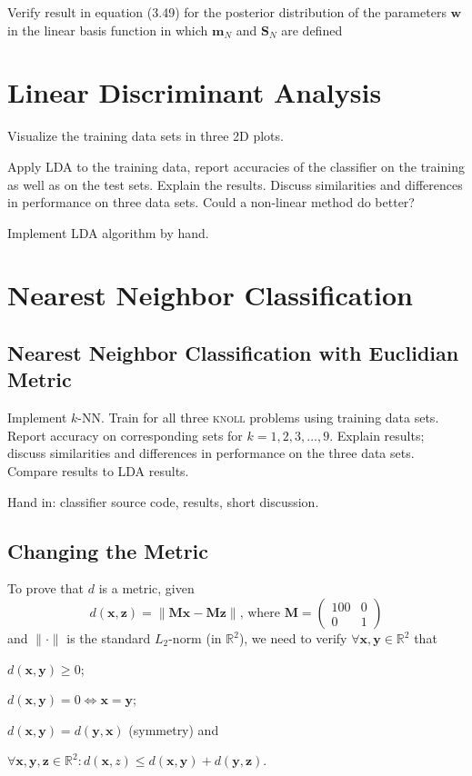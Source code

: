 \documentclass{article}
\newcommand{\vect}[1]{\ensuremath{\boldsymbol{\mathbf{#1}}}\xspace}
\begin{document}
Verify result in equation (3.49) for the posterior distribution of the
parameters \vect{w} in the linear basis function in which $\vect{m}_N$
and $\vect{S}_N$ are defined 

\section{Linear Discriminant Analysis}

Visualize the training data sets in three 2D plots.

Apply LDA to the training data, report accuracies of the classifier on
the training as well as on the test sets. Explain the results. Discuss
similarities and differences in performance on three data sets. Could
a non-linear method do better?

Implement LDA algorithm by hand.

\section{Nearest Neighbor Classification}

\subsection{Nearest Neighbor Classification with Euclidian Metric}

Implement $k$-NN. Train for all three \textsc{knoll} problems using
training data sets. Report accuracy on corresponding sets for $k =
1,2,3,\dots,9$. Explain results; discuss similarities and differences
in performance on the three data sets. Compare results to LDA results.

Hand in: classifier source code, results, short discussion.

\subsection{Changing the Metric}

To prove that $d$ is a metric, given
\[
d(\vect{x},\vect{z}) = \|\vect{M}\vect{x} - \vect{M}\vect{z}\|\text{,
  where } \vect{M} = \begin{pmatrix} 100 & 0 \\ 0 & 1\end{pmatrix}
\]
and $\|\cdot\|$ is the standard $L_2$-norm (in $\mathbb{R}^2$), we
need to verify $\forall \vect{x},\vect{y}\in \mathbb{R}^2$ that
\begin{inparaenum}[1)]
  \item $d(\vect{x},\vect{y}) \geq 0$; 
  \item $d(\vect{x},\vect{y}) = 0 \Leftrightarrow \vect{x} = \vect{y}$;
  \item $d(\vect{x},\vect{y}) =  d(\vect{y},\vect{x})$ (symmetry) and
  \item $\forall \vect{x},\vect{y},\vect{z} \in \mathbb{R}^2 : d(\vect{x},z) \leq d(\vect{x},\vect{y}) + d(\vect{y},\vect{z})$.
\end{inparaenum}
\end{document}
